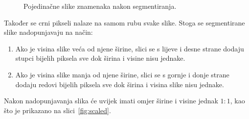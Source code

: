 \begin{figure}[htb]
    \caption{Pojedinačne slike znamenaka nakon segmentiranja.}
    \label{fig:segmented}
\end{figure}
Također se crni pikseli nalaze na samom rubu svake slike. Stoga se segmentirane slike nadopunjavaju na način:
\begin{enumerate}
    \item Ako je visina slike veća od njene širine, slici se s lijeve i desne strane dodaju stupci bijelih piksela sve
    dok širina i visine nisu jednake.
    \item Ako je visina slike manja od njene širine, slici se s gornje i donje strane dodaju redovi bijelih piksela
    sve dok širina i visina slike nisu jednake.
\end{enumerate}
Nakon nadopunjavanja slika će uvijek imati omjer širine i visine jednak $1:1$, kao što je prikazano na
slici\ \ref{fig:scaled}.
